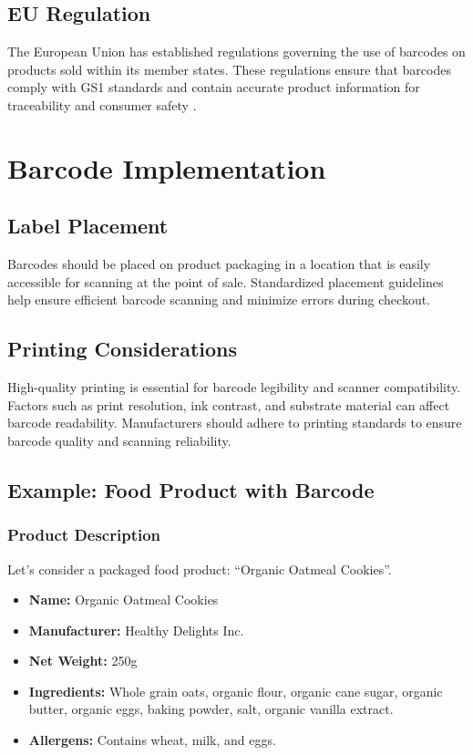 \subsection{EU Regulation}
The European Union has established regulations governing the use of barcodes on products sold within its member states. These regulations ensure that barcodes comply with GS1 standards and contain accurate product information for traceability and consumer safety \cite{eu_regulations}.

\section{Barcode Implementation}

\subsection{Label Placement}
Barcodes should be placed on product packaging in a location that is easily accessible for scanning at the point of sale. Standardized placement guidelines help ensure efficient barcode scanning and minimize errors during checkout.

\subsection{Printing Considerations}
High-quality printing is essential for barcode legibility and scanner compatibility. Factors such as print resolution, ink contrast, and substrate material can affect barcode readability. Manufacturers should adhere to printing standards to ensure barcode quality and scanning reliability.

\subsection{Example: Food Product with Barcode}

\subsubsection{Product Description}

Let's consider a packaged food product: ``Organic Oatmeal Cookies''.

\begin{itemize}
	\item \textbf{Name:} Organic Oatmeal Cookies
	\item \textbf{Manufacturer:} Healthy Delights Inc.
	\item \textbf{Net Weight:} 250g
	\item \textbf{Ingredients:} Whole grain oats, organic flour, organic cane sugar, organic butter, organic eggs, baking powder, salt, organic vanilla extract.
	\item \textbf{Allergens:} Contains wheat, milk, and eggs.
\end{itemize}


